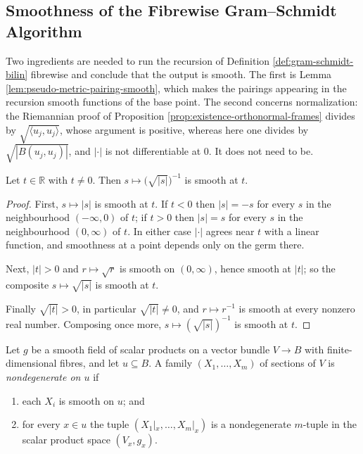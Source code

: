 \subsection{Smoothness of the Fibrewise Gram--Schmidt Algorithm}

Two ingredients are needed to run the recursion of Definition \ref{def:gram-schmidt-bilin} fibrewise and conclude that the output is smooth. The first is Lemma \ref{lem:pseudo-metric-pairing-smooth}, which makes the pairings appearing in the recursion smooth functions of the base point. The second concerns normalization: the Riemannian proof of Proposition \ref{prop:existence-orthonormal-frames} divides by $\sqrt{\langle u_j,u_j\rangle}$, whose argument is positive, whereas here one divides by $\sqrt{|B(u_j,u_j)|}$, and $|\cdot|$ is not differentiable at $0$. It does not need to be.

\begin{lemma}
\label{lem:inv-sqrt-abs-smooth}
\leanok
Let $t \in \mathbb{R}$ with $t \neq 0$. Then $s \mapsto \bigl(\sqrt{|s|}\bigr)^{-1}$ is smooth at $t$.
\end{lemma}

\begin{proof}
\leanok
First, $s \mapsto |s|$ is smooth at $t$. If $t < 0$ then $|s| = -s$ for every $s$ in the neighbourhood $(-\infty,0)$ of $t$; if $t > 0$ then $|s| = s$ for every $s$ in the neighbourhood $(0,\infty)$ of $t$. In either case $|\cdot|$ agrees near $t$ with a linear function, and smoothness at a point depends only on the germ there.

Next, $|t| > 0$ and $r \mapsto \sqrt{r}$ is smooth on $(0,\infty)$, hence smooth at $|t|$; so the composite $s \mapsto \sqrt{|s|}$ is smooth at $t$.

Finally $\sqrt{|t|} > 0$, in particular $\sqrt{|t|} \neq 0$, and $r \mapsto r^{-1}$ is smooth at every nonzero real number. Composing once more, $s \mapsto (\sqrt{|s|})^{-1}$ is smooth at $t$.
\end{proof}

\begin{definition}
\label{def:local-nondegenerate-family}
\leanok
{}
Let $g$ be a smooth field of scalar products on a vector bundle $V \to B$ with finite-dimensional fibres, and let $u \subseteq B$. A family $(X_1,\ldots,X_m)$ of sections of $V$ is \emph{nondegenerate on $u$} if
\begin{enumerate}[label=(\alph*)]
\item each $X_i$ is smooth on $u$; and
\item for every $x \in u$ the tuple $(X_1|_x,\ldots,X_m|_x)$ is a nondegenerate $m$-tuple in the scalar product space $(V_x, g_x)$.
\end{enumerate}
\end{definition}

